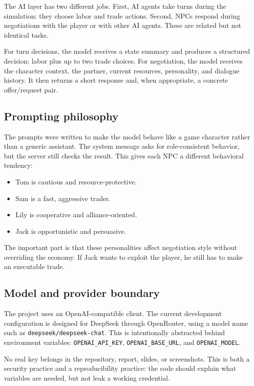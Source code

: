 \documentclass[11pt]{article}
\begin{document}
The AI layer has two different jobs. First, AI agents take turns during the
simulation: they choose labor and trade actions. Second, NPCs respond during
negotiations with the player or with other AI agents. These are related but not
identical tasks.

For turn decisions, the model receives a state summary and produces a structured
decision: labor plus up to two trade choices. For negotiation, the model receives
the character context, the partner, current resources, personality, and dialogue
history. It then returns a short response and, when appropriate, a concrete
offer/request pair.

\subsection{Prompting philosophy}

The prompts were written to make the model behave like a game character rather
than a generic assistant. The system message asks for role-consistent behavior,
but the server still checks the result. This gives each NPC a different
behavioral tendency:

\begin{itemize}
  \item Tom is cautious and resource-protective.
  \item Sam is a fast, aggressive trader.
  \item Lily is cooperative and alliance-oriented.
  \item Jack is opportunistic and persuasive.
\end{itemize}

The important part is that these personalities affect negotiation style without
overriding the economy. If Jack wants to exploit the player, he still has to
make an executable trade.

\subsection{Model and provider boundary}

The project uses an OpenAI-compatible client. The current development
configuration is designed for DeepSeek through OpenRouter, using a model name
such as \texttt{deepseek/deepseek-chat}. This is intentionally abstracted behind
environment variables: \texttt{OPENAI\_API\_KEY},
\texttt{OPENAI\_BASE\_URL}, and \texttt{OPENAI\_MODEL}.

No real key belongs in the repository, report, slides, or screenshots. This is
both a security practice and a reproducibility practice: the code should explain
what variables are needed, but not leak a working credential.
\end{document}
